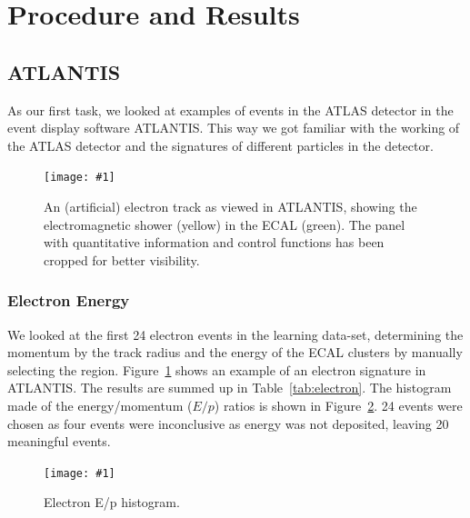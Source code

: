 \documentclass[twocolumn]{article}
\newcommand{\insertFigure}[1]{%
   \texttt{[image: \#1]}%
}
\begin{document}
\section{Procedure and Results} \label{sec:Proc}
\subsection{ATLANTIS}
As our first task, we looked at examples of events in the ATLAS detector in the event display software ATLANTIS. This way we got familiar with the working of the ATLAS detector and the signatures of different particles in the detector.
\begin{figure} [!h]
	\centering
	\insertFigure{Images/Atlantis_Electron_cropped.png}
	\caption{An (artificial) electron track as viewed in ATLANTIS, showing the electromagnetic shower (yellow) in the ECAL (green). The panel with quantitative information and control functions has been cropped for better visibility.}
	\label{fig:elec}
\end{figure}

\subsubsection{Electron Energy}
We looked at the first 24 electron events in the learning data-set, determining the momentum by the track radius and the energy of the ECAL clusters by manually selecting the region. Figure~\ref{fig:elec} shows an example of an electron signature in ATLANTIS. The results are summed up in Table~\ref{tab:electron}. The histogram made of the energy/momentum ($E/p$) ratios is shown in Figure~\ref{fig:electron_histogram}. 24 events were chosen as four events were inconclusive as energy was not deposited, leaving 20 meaningful events.
\begin{figure} [!h]
\centering
\insertFigure{Images/electron_histogram.png}
\caption{Electron E/p histogram.}
\label{fig:electron_histogram}
\end{figure}
\end{document}
